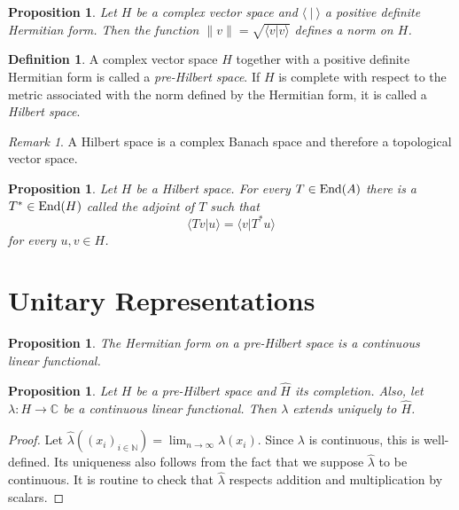 \documentclass[12pt]{article}
\newtheorem{prop}[thm]{Proposition}
\theoremstyle{definition}
\newtheorem{dfn}[thm]{Definition}
\theoremstyle{remark}
\newtheorem{rem}[thm]{Remark}
\newcommand{\End}[1]{\textup{End}(#1)}
\begin{document}
    \begin{prop}
        Let $H$ be a complex vector space and $\langle\ |\ \rangle$ a positive definite Hermitian form. Then the function $\|v\|=\sqrt{\langle v|v \rangle}$ defines a norm on $H$.
    \end{prop}

    \begin{dfn}
        A complex vector space $H$ together with a positive definite Hermitian form is called a \emph{pre-Hilbert space}. If $H$ is complete with respect to the metric associated with the norm defined by the Hermitian form, it is called a \emph{Hilbert space}.
    \end{dfn}

    \begin{rem}
        A Hilbert space is a complex Banach space and therefore a topological vector space.
    \end{rem}

    \begin{prop}
        Let $H$ be a Hilbert space. For every $T\in\End{A}$ there is a $T^*\in\End{H}$ called the \emph{adjoint of $T$} such that
        $$
        \langle Tv|u \rangle = \langle v|T^*u \rangle
        $$
        for every $u,v\in H$.
    \end{prop}

    \section{Unitary Representations}

    \begin{prop}
        The Hermitian form on a pre-Hilbert space is a continuous linear functional.
    \end{prop}

    \begin{prop}
        Let $H$ be a pre-Hilbert space and $\hat H$ its completion. Also, let $\lambda\colon H\to\mathbb{C}$ be a continuous linear functional. Then $\lambda$ extends uniquely to $\hat H$.
    \end{prop}

    \begin{proof}
        Let $\hat \lambda((x_i)_{i\in\mathbb{N}})=\lim_{n\to\infty}\lambda(x_i)$. Since $\lambda$ is continuous, this is well-defined. Its uniqueness also follows from the fact that we suppose $\hat \lambda$ to be continuous. It is routine to check that $\hat \lambda$ respects addition and multiplication by scalars.
    \end{proof}
\end{document}
